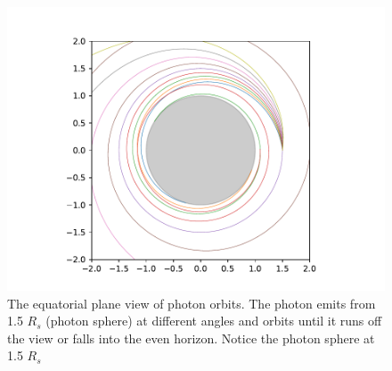\begin{figure}
\centering
\includegraphics[width=\linewidth]{photon_trace.pdf}
\caption{The equatorial plane view of photon orbits. The photon emits from 1.5 $R_s$ (photon sphere) at different angles and orbits until it runs off the view or falls into the even horizon. Notice the photon sphere at 1.5 $R_s$}
\label{photon_trace}
\end{figure}
